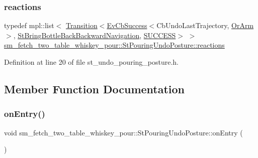 \subsubsection{\texorpdfstring{reactions}{reactions}}
{\footnotesize\ttfamily typedef mpl\+::list$<$ \hyperlink{classsmacc_1_1Transition}{Transition}$<$\hyperlink{structsmacc_1_1EvCbSuccess}{Ev\+Cb\+Success}$<$Cb\+Undo\+Last\+Trajectory, \hyperlink{classsm__fetch__two__table__whiskey__pour_1_1OrArm}{Or\+Arm}$>$, \hyperlink{structsm__fetch__two__table__whiskey__pour_1_1StBringBottleBackBackwardNavigation}{St\+Bring\+Bottle\+Back\+Backward\+Navigation}, \hyperlink{structsmacc_1_1default__transition__tags_1_1SUCCESS}{S\+U\+C\+C\+E\+SS}$>$ $>$ \hyperlink{structsm__fetch__two__table__whiskey__pour_1_1StPouringUndoPosture_aed162ee53c7400df32cc8cea722d41a3}{sm\+\_\+fetch\+\_\+two\+\_\+table\+\_\+whiskey\+\_\+pour\+::\+St\+Pouring\+Undo\+Posture\+::reactions}}



Definition at line 20 of file st\+\_\+undo\+\_\+pouring\+\_\+posture.\+h.



\subsection{Member Function Documentation}
\mbox{\label{structsm__fetch__two__table__whiskey__pour_1_1StPouringUndoPosture_a2f07621303047092bc4eec64661a22d6}} 
\subsubsection{\texorpdfstring{on\+Entry()}{onEntry()}}
{\footnotesize\ttfamily void sm\+\_\+fetch\+\_\+two\+\_\+table\+\_\+whiskey\+\_\+pour\+::\+St\+Pouring\+Undo\+Posture\+::on\+Entry (\begin{DoxyParamCaption}{ }\end{DoxyParamCaption})\hspace{0.3cm}{\ttfamily [inline]}}



